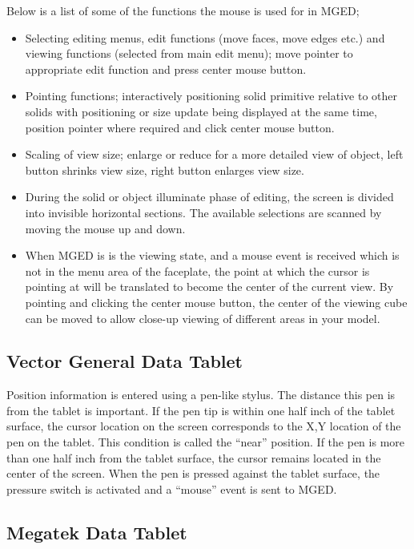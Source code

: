 Below is a list of some of the functions the mouse is used for in MGED;
\begin{itemize}
\item
Selecting editing menus, edit functions (move faces, move edges
etc.) and viewing functions (selected from main edit menu); move
pointer to appropriate edit function and press center mouse button.
\item
Pointing functions; interactively positioning solid primitive
relative to other solids with positioning or size update being
displayed at the same time, position pointer where required and click
center mouse button.
\item
Scaling of view size; enlarge or reduce for a more detailed view of
object, left button shrinks view size, right button enlarges view
size.
\item
During the solid or object illuminate phase of editing,
the screen is divided into
invisible horizontal sections.
The available selections are scanned by moving the mouse up and down.
\item
When MGED is is the viewing state,
and a mouse event is received which is not in the menu area of the faceplate,
the point at which the cursor is pointing at will be translated to become
the center of the current view.
By pointing and clicking the center mouse button,
the center of the viewing cube
can be moved to allow close-up viewing of different areas in your
model.
\end{itemize}

\subsection{Vector General Data Tablet}

Position information is entered using a pen-like stylus.
The distance this pen is from the tablet is important.
If the pen tip is within one half inch of the tablet surface, the cursor
location on the screen corresponds to the X,Y location of the
pen on the tablet.  This condition is called the ``near'' position.
If the pen is more than one half inch from the tablet surface, the
cursor remains located in the center of the screen.
When the pen is pressed against the tablet surface,
the pressure switch is activated and a ``mouse'' event
is sent to MGED.

\subsection{Megatek Data Tablet}

